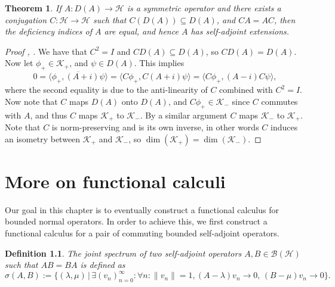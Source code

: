 \documentclass[12pt,oneside]{report}
\newtheorem{thm}{Theorem}[chapter]
\newtheorem{defn}[thm]{Definition}
\begin{document}
\begin{thm}\label{vonNeumann}
    If $A: D(A) \to \mathscr{H}$ is a symmetric operator and there exists a conjugation $C: \mathscr{H} \to \mathscr{H}$ such that $C(D(A)) \subseteq D(A)$, and $CA = AC$, then the deficiency indices of $A$ are equal, and hence $A$ has self-adjoint extensions.
\end{thm}
\begin{proof}[Proof \cite{simon_classical_1998}, \cite{Reed_Simon_1975}]
     We have that $C^{2} = I$ and $CD(A) \subseteq D(A)$, so $CD(A) = D(A)$. Now let $\phi_{+} \in \mathscr{K}_{+}$, and $\psi \in D(A)$. This implies
     $$0 = \overline{\langle \phi_{+}, (A + i) \psi \rangle} = \langle C\phi_{+}, C(A+i)\psi \rangle = \langle C\phi_{+}, (A-i)C\psi \rangle,$$
     where the second equality is due to the anti-linearity of $C$ combined with $C^{2} = I$. Now note that $C$ maps $D(A)$ onto $D(A)$, and $C\phi_{+} \in \mathscr{K}_{-}$ since $C$ commutes with $A$, and thus $C$ maps $\mathscr{K}_{+}$ to $\mathscr{K}_{-}$. By a similar argument $C$ maps $\mathscr{K}_{-}$ to $\mathscr{K}_{+}$. Note that $C$ is norm-preserving and is its own inverse, in other words $C$ induces an isometry between $\mathscr{K}_{+}$ and $\mathscr{K}_{-}$, so $\dim(\mathscr{K}_{+}) = \dim(\mathscr{K}_{-})$.
\end{proof}

\chapter{More on functional calculi}\label{ch6}

Our goal in this chapter is to eventually construct a functional calculus for bounded normal operators. In order to achieve this, we first construct a functional calculus for a pair of commuting bounded self-adjoint operators.

\begin{defn}
    \cite{kallstrom_joint_1985} The joint spectrum of two self-adjoint operators $A,B \in \mathscr{B}(\mathscr{H})$ such that $AB = BA$ is defined as
    $$\sigma(A,B) := \{ (\lambda,\mu) \, | \, \exists (v_{n})_{n=0}^{\infty}: \forall n: \|v_{n}\| = 1, (A - \lambda)v_{n} \to 0, \, (B - \mu)v_{n} \to 0 \}.$$
\end{defn}
\end{document}
